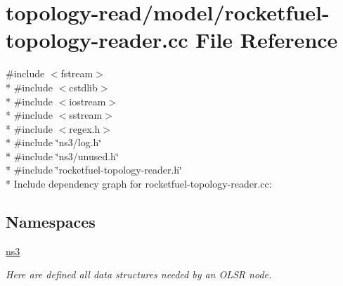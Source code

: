 \hypertarget{rocketfuel-topology-reader_8cc}{}\section{topology-\/read/model/rocketfuel-\/topology-\/reader.cc File Reference}
\label{rocketfuel-topology-reader_8cc}
{\ttfamily \#include $<$fstream$>$}\\*
{\ttfamily \#include $<$cstdlib$>$}\\*
{\ttfamily \#include $<$iostream$>$}\\*
{\ttfamily \#include $<$sstream$>$}\\*
{\ttfamily \#include $<$regex.\+h$>$}\\*
{\ttfamily \#include \char`\"{}ns3/log.\+h\char`\"{}}\\*
{\ttfamily \#include \char`\"{}ns3/unused.\+h\char`\"{}}\\*
{\ttfamily \#include \char`\"{}rocketfuel-\/topology-\/reader.\+h\char`\"{}}\\*
Include dependency graph for rocketfuel-\/topology-\/reader.cc\+:
\subsection*{Namespaces}
\begin{DoxyCompactItemize}
\item 
 \hyperlink{namespacens3}{ns3}
\begin{DoxyCompactList}\small\item\em Here are defined all data structures needed by an O\+L\+SR node. \end{DoxyCompactList}\end{DoxyCompactItemize}
